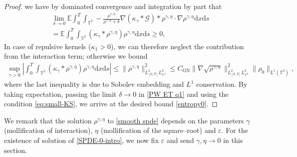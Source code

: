 \begin{proof}
we have by dominated convergence and integration by part that
\begin{align*}
\lim_{\delta \to 0} \mathbb{E}\int_0^T\int_{\mathbb{T}^2} - \frac{\rho^{\gamma, \eta}}{\rho^{\gamma, \eta}+\delta}\nabla (\kappa_{\gamma}\ast\mathcal{G}) \ast \rho^{\gamma, \eta}\cdot\nabla\rho^{\gamma, \eta}\mathrm{d}x\mathrm{d}s\\
 =  \mathbb{E} \int_0^T\int_{\mathbb{T}^2} (\kappa_{\gamma} \ast \rho^{\gamma, \eta}) \rho^{\gamma, \eta} \mathrm{d}x\mathrm{d}s \geq 0,
\end{align*}
In case of repulsive kernels ($\kappa_1 > 0$), we can therefore neglect the contribution from the interaction term; otherwise we bound
\begin{align*}
\sup_{\gamma > 0}\left|\int_0^T\int_{\mathbb{T}^2} (\kappa_{\gamma} \ast \rho^{\gamma, \eta}) \rho^{\gamma, \eta} \mathrm{d}x\mathrm{d}s\right| \leq \|\rho^{\gamma, \eta}\|^2_{L^2_{[0,T]}L^2_{\mathbb{T}^2}} \leq C_{\mathrm{GN}}\|\nabla\sqrt{\rho^{\gamma, \eta}}\|_{L^2_{[0,T]}L^2_{\mathbb{T}^2}}^2\|\rho_0\|_{L^1(\mathbb{T}^2)},
\end{align*}
where the last inequality is due to Sobolev embedding and $L^1$ conservation. By taking expectation, passing the limit $\delta \to 0$ in \eqref{PW ET q1} and using the condition \eqref{eq:small-KS}, we arrive at the desired bound \eqref{entropy0}.
\end{proof}


We remark that the solution $\rho^{\gamma, \eta}$ to \eqref{smooth spde} depends on the parameters $\gamma$ (mollification of interaction), $\eta$ (mollification of the square--root) and $\varepsilon$. For the existence of solution of \eqref{SPDE-0-intro}, we now fix $\varepsilon$ and send $\gamma, \eta \to 0$ in this section.

